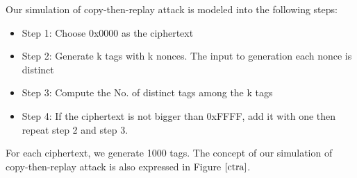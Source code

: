 \documentclass{article}
\begin{document}
Our simulation of copy-then-replay attack is modeled into the following steps:
\begin{itemize}
	\item Step 1: Choose 0x0000 as the ciphertext 
	\item Step 2: Generate k tags with k nonces. The input to generation each nonce is distinct
	\item Step 3: Compute the No. of distinct tags among the k tags
	\item Step 4: If the ciphertext is not bigger than 0xFFFF, add it with one then repeat step 2 and step 3.
\end{itemize}
For each ciphertext, we generate 1000 tags. The concept of our simulation of copy-then-replay attack is also expressed in Figure $\ref{ctra}$.
\end{document}
